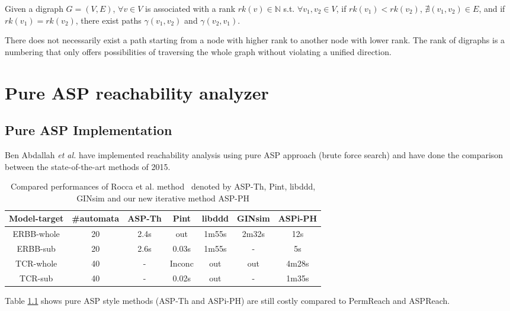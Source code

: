 \begin{definition}\label{def:rank}
Given a digraph $G=(V,E)$, $\forall v\in V$ is associated with a rank $rk(v)\in \mathbb{N}$ s.t. $\forall v_1,v_2\in V$, if $rk(v_1)<rk(v_2)$, $\nexists (v_1,v_2)\in E$, and if $rk(v_1)=rk(v_2)$, there exist paths $\gamma(v_1,v_2)$ and $\gamma(v_2,v_1)$.
\end{definition}
\begin{remark}
There does not necessarily exist a path starting from a node with higher rank to another node with lower rank.
The rank of digraphs is a numbering that only offers possibilities of traversing the whole graph without violating a unified direction.
\end{remark}


\chapter{Pure ASP reachability analyzer}
\section{Pure ASP Implementation}\label{sec:pureASP}
Ben Abdallah \textit{et al.} \cite{abdallah2015exhaustive} have implemented reachability analysis using pure ASP approach (brute force search) and have done the comparison between the state-of-the-art methods of 2015.

\begin{table}[ht]
    \centering
    \footnotesize
    \begin{tabular}{c|c|c|c|c|c|c}
        Model-target & \#automata & ASP-Th & Pint & libddd & GINsim & ASPi-PH\\
        \hline
        ERBB-whole & 20& 2.4s& out& 1m55s& 2m32s& 12s\\
        \hline
        ERBB-sub& 20& 2.6s& 0.03s& 1m55s& -& 5s\\
        \hline
        TCR-whole& 40& - &Inconc& out& out& 4m28s\\
        \hline
        TCR-sub& 40 &- &0.02s& out& -& 1m35s
    \end{tabular}
    \caption[Performance of pure ASP method]{Compared performances of Rocca et al. method~\cite{rocca2014asp} denoted by ASP-Th, Pint, libddd, GINsim and our new iterative method ASP-PH}
    \label{tab:pureAsp}
\end{table}

Table \ref{tab:pureAsp} shows pure ASP style methods (ASP-Th and ASPi-PH) are still costly compared to PermReach and ASPReach.